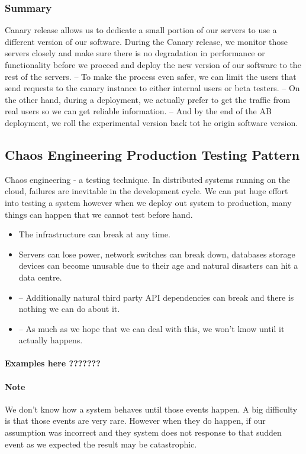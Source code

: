 \documentclass[a4paper, 11pt]{book}
\begin{document}
    \subsubsection{Summary}
    Canary release allows us to dedicate a small portion of our servers to use a different version of our software.
    During the Canary release, we monitor those servers closely and make sure there is no degradation in performance or functionality before we proceed and deploy the new version of our software to the rest of the servers.
    -- To make the process even safer, we can limit the users that send requests to the canary instance to either internal users or beta testers.
    -- On the other hand, during a  deployment, we actually prefer to get the traffic from real users so we can get reliable information.
    -- And by the end of the AB deployment, we roll the experimental version back tot he origin software version.

    \subsection{Chaos Engineering Production Testing Pattern}
    Chaos engineering - a testing technique.
    In distributed systems running on the cloud, failures are inevitable in the development cycle.
    We can put huge effort into testing a system however when we deploy out system to production, many things can happen that we cannot test before hand.
    \begin{itemize}
        \item The infrastructure can break at any time.
        \item Servers can lose power, network switches can break down, databases storage devices can become unusable due to their age and natural disasters can hit a data centre.
        \item -- Additionally natural third party API dependencies can break and there is nothing we can do about it.
        \item -- As much as we hope that we can deal with this, we won't know until it actually happens.
    \end{itemize}

    \paragraph{Examples here ???????}

    \paragraph{Note}
    We don't know how a system behaves until those events happen.
    A big difficulty is that those events are very rare.
    However when they do happen, if our assumption was incorrect and they system does not response to that sudden event as we expected the result may be catastrophic.
\end{document}

